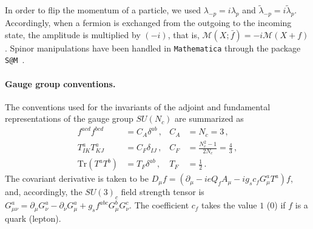 In order to flip the momentum of a particle, we used $\lambda_{-p}=i\lambda_p$ and $\tilde \lambda_{-p}=i\tilde \lambda_p$.
Accordingly, when a fermion is exchanged from the outgoing to the incoming state, the amplitude is multiplied by $(-i)$, that is, $\mathcal M(X;\bar f) = -i \mathcal M(X+f)$.
Spinor manipulations have been handled in \texttt{Mathematica} through the package \texttt{S@M}~\cite{Maitre:2007jq}.

\paragraph{Gauge group conventions.}
The conventions used for the invariants of the adjoint and fundamental representations of the gauge group $SU(N_c)$ are summarized as
\begin{align}
    f^{acd}f^{bcd} &= C_A\delta^{ab}\,, &
    C_A &= N_c = 3\,, \\
    T^a_{IK}T^a_{KJ} &= C_F \delta_{IJ}\,, & C_F &=\frac{N_c^2-1}{2N_c}=\frac{4}{3}\,, \\
    \text{Tr}(T^a T^b) &= T_F \delta^{ab}\,, &
    T_F &= \frac{1}{2}\,.
\end{align}
The covariant derivative is taken to be $D_\mu f = (\partial_\mu - i e Q_f A_\mu - i g_s c_f G_\mu^a T^a)f$, and, accordingly, the $SU(3)_c$ field strength tensor is $G^a_{\mu\nu} = \partial_\mu G_\nu^a - \partial_\nu G_\mu^a + g_s f^{abc} G_\mu^b G_\nu^c$.
The coefficient $c_f$ takes the value $1$ ($0$) if $f$ is a quark (lepton).